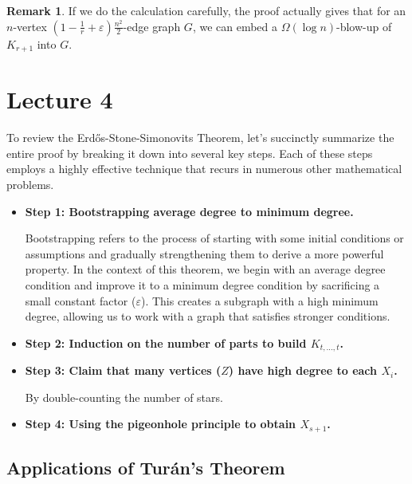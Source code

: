 \documentclass{article}
\theoremstyle{definition}
\newtheorem{remark}[theorem]{Remark}
\def\Erdos{Erd\H{o}s}
\def\Turan{Tur\'an}
\begin{document}
\begin{remark}
    If we do the calculation carefully, the proof actually gives that for an $n$-vertex $(1-\frac{1}{r}+\varepsilon)\frac{n^2}{2}$-edge graph $G$, we can embed a $\Omega(\log n)$-blow-up of $K_{r+1}$ into $G$.
\end{remark}


\newpage


\section{Lecture 4}

To review the \Erdos{}-Stone-Simonovits Theorem, let's succinctly summarize the entire proof by breaking it down into several key steps. Each of these steps employs a highly effective technique that recurs in numerous other mathematical problems.

\begin{itemize}

    \item \textbf{Step 1: Bootstrapping average degree to minimum degree.}
    
    Bootstrapping refers to the process of starting with some initial conditions or assumptions and gradually strengthening them to derive a more powerful property. In the context of this theorem, we begin with an average degree condition and improve it to a minimum degree condition by sacrificing a small constant factor ($\varepsilon$). This creates a subgraph with a high minimum degree, allowing us to work with a graph that satisfies stronger conditions.
    
    \item \textbf{Step 2: Induction on the number of parts to build $K_{t, \ldots, t}$.}
    
    \item \textbf{Step 3: Claim that many vertices ($Z$) have high degree to each $X_i$.}
    
    By double-counting the number of stars.
    
    \item \textbf{Step 4: Using the pigeonhole principle to obtain $X_{s+1}$.}
    
\end{itemize}

\subsection{Applications of \Turan{}'s Theorem}
\end{document}
